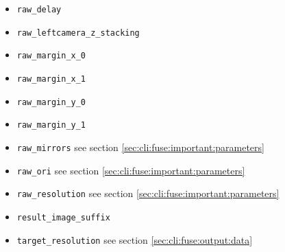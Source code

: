 \begin{itemize}
\item \texttt{raw\_delay}
\item \texttt{raw\_leftcamera\_z\_stacking}
\item \texttt{raw\_margin\_x\_0}
\item \texttt{raw\_margin\_x\_1}
\item \texttt{raw\_margin\_y\_0}
\item \texttt{raw\_margin\_y\_1}
\item \texttt{raw\_mirrors} see section \ref{sec:cli:fuse:important:parameters}
\item \texttt{raw\_ori} see section \ref{sec:cli:fuse:important:parameters}
\item \texttt{raw\_resolution} see section \ref{sec:cli:fuse:important:parameters}
\item \texttt{result\_image\_suffix}
\item \texttt{target\_resolution} see section \ref{sec:cli:fuse:output:data}
\end{itemize}
